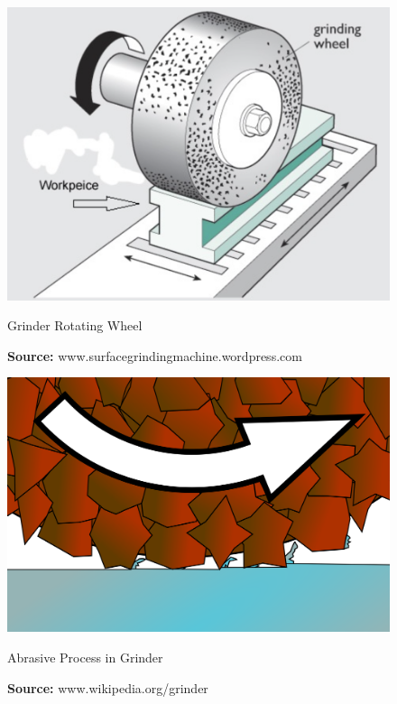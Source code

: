 \begin{figure}[h]
  \centering
  \begin{minipage}[b]{0.4\textwidth}
    \includegraphics[width=\textwidth]{./Images/GW.png}
    \caption{Grinder Rotating Wheel}
    \label{grinder1}
    \caption*{\textbf{Source:} www.surfacegrindingmachine.wordpress.com}
  \end{minipage}
  \hfill
  \begin{minipage}[b]{0.45\textwidth}
    \includegraphics[width=\textwidth]{./Images/grinder2.png}
    \caption{Abrasive Process in Grinder}
    \label{grinder2}
    \caption*{\textbf{Source:} www.wikipedia.org/grinder}
  \end{minipage}
\end{figure}




